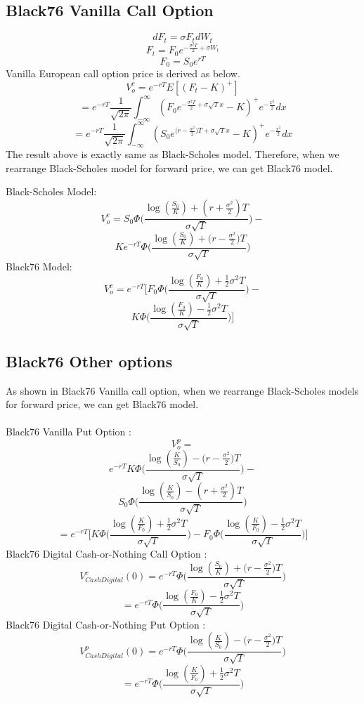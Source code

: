 \documentclass[fleqn,12pt]{SelfArx}
\begin{document}
\subsection{Black76 Vanilla Call Option}

$$
dF_t = \sigma F_tdW_t
$$$$
F_t = F_0e^{-\frac{\sigma^{2}T}{2} + \sigma W_t}
$$$$
F_0 = S_0e^{rT}
$$
Vanilla European call option price is derived as below.
$$
V_o^{c} = e^{-rT}{E}[(F_t-K)^{+}]
$$$$
= e^{-rT}\frac{1}{\sqrt{2\pi}}\int_{-\infty}^{\infty}(F_0e^{-\frac{\sigma^{2}T}{2} +\sigma\sqrt{T}x}-K)^{+}e^{-\frac{x^{2}}{2}}dx
$$
$$
= e^{-rT}\frac{1}{\sqrt{2\pi}}\int_{-\infty}^{\infty}(S_0e^{\big(r-\frac{\sigma^{2}}{2}\big)T +\sigma\sqrt{T}x}-K)^{+}e^{-\frac{x^{2}}{2}}dx
$$
The result above is exactly same as Black-Scholes model.
Therefore, when we rearrange Black-Scholes model for forward price, we can get Black76 model.

Black-Scholes Model:
$$
V_o^{c} = S_0\Phi\Bigg(\frac{\log({\frac{S_0}{K}})+(r+\frac{\sigma^{2}}{2})T}{\sigma\sqrt{T}}\Bigg) -
$$$$
Ke^{-rT}\Phi\Bigg(\frac{\log({\frac{S_0}{K}})+\big(r-\frac{\sigma^{2}}{2}\big)T}{\sigma\sqrt{T}}\Bigg)
$$
Black76 Model:
$$
V_o^{c} = e^{-rT}\Bigg[ F_0\Phi\Bigg(\frac{\log({\frac{F_0}{K}})+\frac{1}{2}\sigma^{2}T}{\sigma\sqrt{T}}\Bigg) -
$$$$
K\Phi\Bigg(\frac{\log({\frac{F_0}{K}})-\frac{1}{2}\sigma^{2}T}{\sigma\sqrt{T}}\Bigg)\Bigg]
$$

\subsection{Black76 Other options}
As shown in Black76 Vanilla call option, when we rearrange Black-Scholes models for forward price, we can get Black76 model.
\\
\\
Black76 Vanilla Put Option :
$$
V_o^{p} =
$$$$
e^{-rT}K\Phi\Bigg(\frac{\log({\frac{K}{S_0}})-\big(r-\frac{\sigma^{2}}{2}\big)T}{\sigma\sqrt{T}}\Bigg) -
$$$$
S_0\Phi\Bigg(\frac{\log({\frac{K}{S_0}})-(r+\frac{\sigma^{2}}{2})T}{\sigma\sqrt{T}}\Bigg)
$$
$$
= e^{-rT}\Bigg[K\Phi\Bigg(\frac{\log({\frac{K}{F_0}})+\frac{1}{2}\sigma^{2}T}{\sigma\sqrt{T}}\Bigg) - F_0\Phi\Bigg(\frac{\log({\frac{K}{F_0}})-\frac{1}{2}\sigma^{2}T}{\sigma\sqrt{T}}\Bigg)\Bigg]
$$
Black76 Digital Cash-or-Nothing Call Option :
$$
V^{c}_{Cash Digital}(0) = e^{-rT}\Phi\Bigg(\frac{\log({\frac{S_0}{K}})+\big(r-\frac{\sigma^{2}}{2}\big)T}{\sigma\sqrt{T}} \Bigg)
$$
$$
= e^{-rT}\Phi\Bigg(\frac{\log({\frac{F_0}{K}})-\frac{1}{2}\sigma^{2}T}{\sigma\sqrt{T}} \Bigg)
$$
Black76 Digital Cash-or-Nothing Put Option :
$$
V^{p}_{Cash Digital}(0) = e^{-rT}\Phi\Bigg( \frac{\log({\frac{K}{S_0}})-\big(r-\frac{\sigma^{2}}{2}\big)T}{\sigma\sqrt{T}} \Bigg)
$$
$$
= e^{-rT}\Phi\Bigg(\frac{\log({\frac{K}{F_0}})+\frac{1}{2}\sigma^{2}T}{\sigma\sqrt{T}} \Bigg)
$$
\end{document}
